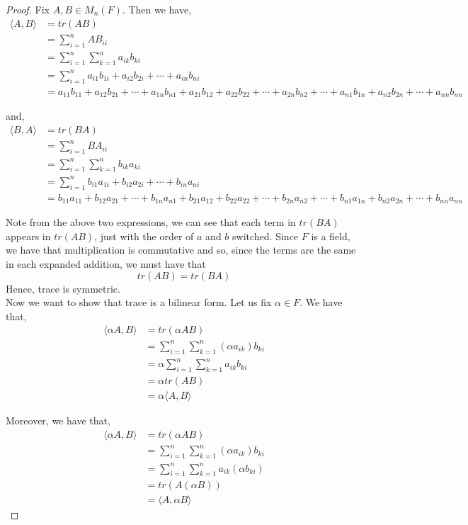 \documentclass[11pt, reqno]{amsart}
\theoremstyle{plain}
\theoremstyle{definition}
\theoremstyle{example}
\def\<{\langle} \def\>{\rangle}
\begin{document}
\begin{proof}
Fix $A, B \in M_n(F)$. Then we have,
\begin{align*}
\<A, B\> &= tr(AB)\\
&= \sum_{i=1}^n AB_{ii}\\
&= \sum_{i=1}^n \sum_{k=1}^n a_{ik}b_{ki}\\
&= \sum_{i=1}^n a_{i1}b_{1i} + a_{i2}b_{2i} + \cdots + a_{in}b_{ni}\\
&= a_{11}b_{11} + a_{12}b_{21} + \cdots + a_{1n}b_{n1} + a_{21}b_{12} + a_{22}b_{22} + \cdots + a_{2n}b_{n2} + \cdots + a_{n1}b_{1n} + a_{n2}b_{2n} + \cdots + a_{nn}b_{nn}
\end{align*}

and,
\begin{align*}
\<B, A\> &= tr(BA)\\
&= \sum_{i=1}^n BA_{ii}\\
&= \sum_{i=1}^n \sum_{k=1}^n b_{ik}a_{ki}\\
&= \sum_{i=1}^n b_{i1}a_{1i} + b_{i2}a_{2i} + \cdots + b_{in}a_{ni}\\
&= b_{11}a_{11} + b_{12}a_{21} + \cdots + b_{1n}a_{n1} + b_{21}a_{12} + b_{22}a_{22} + \cdots + b_{2n}a_{n2} + \cdots + b_{n1}a_{1n} + b_{n2}a_{2n} + \cdots + b_{nn}a_{nn}
\end{align*}

Note from the above two expressions, we can see that each term in $tr(BA)$ appears in $tr(AB)$, just with the order of $a$ and $b$  switched. Since $F$ is a field, we have that multiplication is commutative and so, since the terms are the same in each expanded addition, we must have that $$tr(AB) = tr(BA)$$ Hence, trace is symmetric.\\

Now we want to show that trace is a bilinear form. Let us fix $\alpha \in F$. We have that,
\begin{align*}
\< \alpha A, B \> &= tr(\alpha A B)\\
&= \sum_{i=1}^n \sum_{k=1}^n (\alpha a_{ik})b_{ki}\\
&= \alpha \sum_{i=1}^n \sum_{k=1}^n  a_{ik}b_{ki}\\
&= \alpha tr(AB)\\
&= \alpha \< A, B\>
\end{align*}

Moreover, we have that,
\begin{align*}
\< \alpha A, B \> &= tr(\alpha A B)\\
&= \sum_{i=1}^n \sum_{k=1}^n (\alpha a_{ik})b_{ki}\\
&= \sum_{i=1}^n \sum_{k=1}^n  a_{ik}(\alpha b_{ki})\\
&= tr(A(\alpha B))\\
&= \<A, \alpha B\>
\end{align*}


\end{proof}
\end{document}
